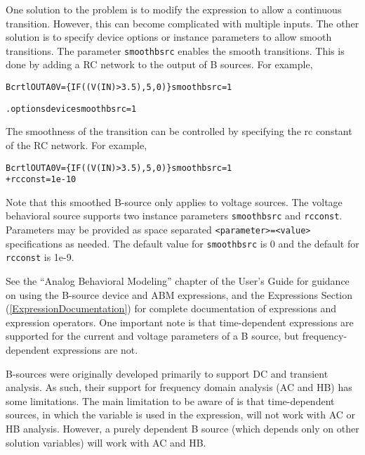 \begin{Device}
One solution to the problem is to modify the expression to allow a continuous transition. 
However, this can become complicated with multiple inputs. The other solution is to specify
device options or instance parameters to allow smooth transitions. The parameter
\texttt{smoothbsrc} enables the smooth transitions. This is done by adding a RC network to the  
output of B sources. For example,

\begin{alltt} Bcrtl OUTA 0 V=\{ IF( (V(IN) > 3.5), 5, 0 ) \} smoothbsrc=1 \end{alltt}

\begin{alltt} .options device  smoothbsrc=1 \end{alltt}

The smoothness of the transition can be controlled by specifying the rc constant of 
the RC network. For example, 

\begin{alltt} Bcrtl OUTA 0 V=\{ IF( (V(IN) > 3.5), 5, 0 ) \} smoothbsrc=1   
 + rcconst = 1e-10 \end{alltt}

Note that this smoothed B-source only applies to voltage sources. The voltage behavioral source supports
two instance parameters \texttt{smoothbsrc} and \texttt{rcconst}. Parameters may be provided as space  
separated \texttt{<parameter>=<value>} specifications as needed. The default value for \texttt{smoothbsrc}
is 0 and the default for \texttt{rcconst} is 1e-9.

See the ``Analog Behavioral Modeling'' chapter of the \Xyce{} User's
Guide for guidance on using the B-source device and ABM expressions,
and the Expressions Section (\ref{ExpressionDocumentation}) for
complete documentation of expressions and expression operators.
One important note is that time-dependent expressions are supported
for the current and voltage parameters of a B source, but
frequency-dependent expressions are not.

B-sources were originally developed primarily to support DC and transient analysis.  
As such, their support for frequency domain analysis (AC and HB) has some 
limitations.  The main limitation to be aware of is that time-dependent sources, 
in which the variable  is used in the expression, will not work with AC or HB analysis.  
However, a purely dependent B source (which depends only on other solution variables) will 
work with AC and HB.

\end{Device}
